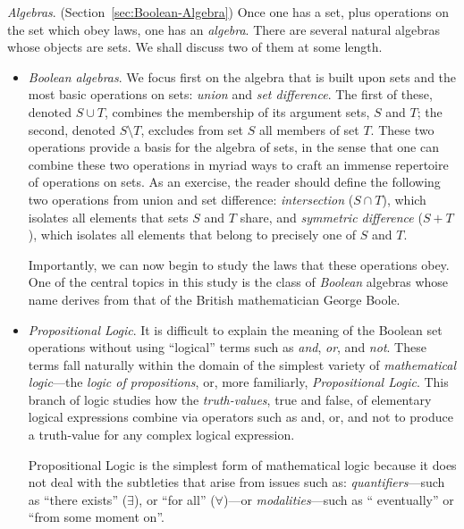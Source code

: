 {\it Algebras}.  (Section~\ref{sec:Boolean-Algebra})
 Once one has a set, plus
operations on the set which obey laws, one has an {\it algebra}.
 There are several natural algebras whose
objects are sets.  We shall discuss two of them at some length.
\begin{itemize}
\item
{\it Boolean algebras}.  We focus first on the algebra that is built
upon sets and the most basic operations on sets: {\it union} and {\it
  set difference}.  The first of these, denoted $S \cup T$, combines
the membership of its argument sets, $S$ and $T$; the second, denoted
$S \setminus T$, excludes from set $S$ all members of set $T$.  These
two operations provide a basis for the algebra of sets, in the sense
that one can combine these two operations in myriad ways to craft an
immense repertoire of operations on sets.  As an exercise, the reader
should define the following two operations from union and set
difference: {\it intersection} ($S \cap T$), which isolates all
elements that sets $S$ and $T$ share, and {\it symmetric difference}
($S+T$), which isolates all elements that belong to precisely one of
$S$ and $T$.


Importantly, we can now begin to study the laws that these operations
obey.  One of the central topics in this study is the class of {\it
  Boolean} algebras  whose name
derives from that of the British mathematician George
Boole. 

\item
{\it Propositional Logic}.  
It is difficult to explain the meaning of the Boolean set operations
without using ``logical'' terms such as {\it and}, {\it or}, and {\it
  not}.  These terms fall naturally within the domain of the simplest
variety of {\it mathematical logic}---the {\it logic of propositions},
or, more familiarly, {\it Propositional Logic}.  This branch of logic
studies how the {\em truth-values}, {\sc true} and {\sc false}, of
elementary logical expressions combine via operators such as {\sc
  and}, {\sc or}, and {\sc not} to produce a truth-value for any
complex logical expression.

Propositional Logic is the simplest form of mathematical logic because
it does not deal with the subtleties that arise from issues such as:
{\it quantifiers}---such as ``{\sc there exists}'' ($\exists$), or
``{\sc for all}'' ($\forall$)---or {\it modalities}---such as ``{\sc
  eventually}'' or ``{\sc from some moment on}''.


\end{itemize}
